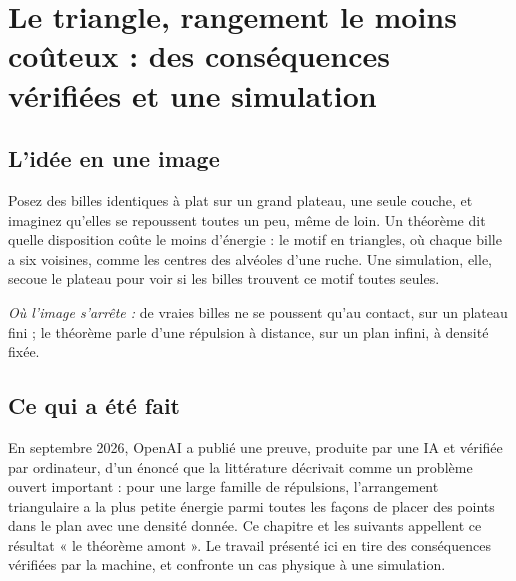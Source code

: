 \chapter[Le triangle, rangement le moins coûteux]{Le triangle, rangement le moins coûteux : des conséquences vérifiées et une simulation}

\section*{L'idée en une image}

\begin{analogie}
Posez des billes identiques à plat sur un grand plateau, une seule couche, et imaginez qu'elles se repoussent toutes
un peu, même de loin. Un théorème dit quelle disposition coûte le moins d'énergie : le motif en triangles, où chaque
bille a six voisines, comme les centres des alvéoles d'une ruche. Une simulation, elle, secoue le plateau pour voir si les billes trouvent ce motif toutes seules.

\emph{Où l'image s'arrête :} de vraies billes ne se poussent qu'au contact, sur un plateau fini ; le théorème parle
d'une répulsion à distance, sur un plan infini, à densité fixée.
\end{analogie}

\section*{Ce qui a été fait}

En septembre 2026, OpenAI a publié une preuve, produite par une IA et vérifiée par ordinateur, d'un énoncé que la
littérature décrivait comme un problème ouvert important : pour une large famille de répulsions, l'arrangement triangulaire a la plus petite énergie parmi
toutes les façons de placer des points dans le plan avec une densité donnée. Ce chapitre et les suivants appellent ce
résultat « le théorème amont ». Le travail présenté ici en tire des conséquences vérifiées par la machine, et confronte
un cas physique à une simulation.

